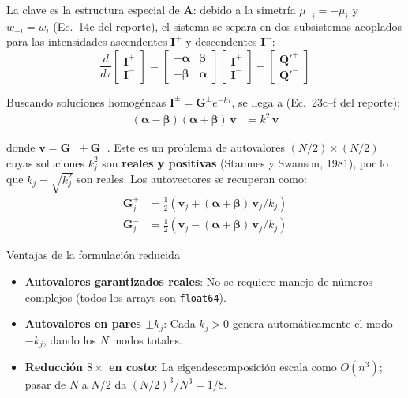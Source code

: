 \documentclass[a4paper,11pt]{article}
\begin{document}
La clave es la estructura especial de $\mathbf{A}$: debido a la simetr\'ia
$\mu_{-i} = -\mu_i$ y $w_{-i} = w_i$ (Ec.~14e del reporte), el sistema se
separa en dos subsistemas acoplados para las intensidades ascendentes
$\mathbf{I}^+$ y descendentes $\mathbf{I}^-$:
\begin{equation}
    \frac{d}{d\tau}\begin{bmatrix}\mathbf{I}^+\\\mathbf{I}^-\end{bmatrix}
    = \begin{bmatrix}-\bm{\alpha} & \bm{\beta}\\
    -\bm{\beta} & \bm{\alpha}\end{bmatrix}
    \begin{bmatrix}\mathbf{I}^+\\\mathbf{I}^-\end{bmatrix}
    - \begin{bmatrix}\mathbf{Q}'^+\\\mathbf{Q}'^-\end{bmatrix}
\end{equation}

Buscando soluciones homog\'eneas $\mathbf{I}^\pm = \mathbf{G}^\pm e^{-k\tau}$,
se llega a (Ec.~23c--f del reporte):
\begin{align}
    (\bm{\alpha} - \bm{\beta})(\bm{\alpha} + \bm{\beta})\,\mathbf{v} &= k^2\,\mathbf{v}
    \label{eq:reduced_eigen}
\end{align}

donde $\mathbf{v} = \mathbf{G}^+ + \mathbf{G}^-$.  Este es un problema de
autovalores $(N/2) \times (N/2)$ cuyas soluciones $k_j^2$ son \textbf{reales y
positivas} (Stamnes y Swanson, 1981), por lo que $k_j = \sqrt{k_j^2}$ son
reales.  Los autovectores se recuperan como:
\begin{align}
    \mathbf{G}_j^+ &= \tfrac{1}{2}\left(\mathbf{v}_j + (\bm{\alpha}+\bm{\beta})\,\mathbf{v}_j / k_j\right)\\
    \mathbf{G}_j^- &= \tfrac{1}{2}\left(\mathbf{v}_j - (\bm{\alpha}+\bm{\beta})\,\mathbf{v}_j / k_j\right)
\end{align}

\begin{keyresult}{Ventajas de la formulaci\'on reducida}
\begin{itemize}
    \item \textbf{Autovalores garantizados reales}: No se requiere manejo de
          n\'umeros complejos (todos los arrays son \texttt{float64}).
    \item \textbf{Autovalores en pares $\pm k_j$}: Cada $k_j > 0$ genera
          autom\'aticamente el modo $-k_j$, dando los $N$ modos totales.
    \item \textbf{Reducci\'on $8\times$ en costo}: La eigendescomposici\'on escala
          como $O(n^3)$; pasar de $N$ a $N/2$ da $(N/2)^3 / N^3 = 1/8$.
\end{itemize}
\end{keyresult}
\end{document}
